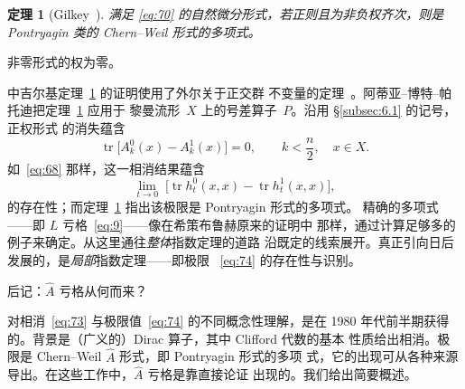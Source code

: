 \documentclass[11pt]{amsart}
\makeatletter
\def\subsection{\@startsection{subsection}{2}%
   \z@{1.25\linespacing\@plus.7\linespacing}{.5\linespacing}%
   {\normalfont\bfseries}}
\theoremstyle{definition}
\theoremstyle{remark}
\theoremstyle{plain}
\newtheorem{theorem}[equation]{定理}
\numberwithin{equation}{section}
\renewcommand{\:}{\colon}
\newcommand{\Ahat}{{\hat A}}
\DeclareMathOperator{\tr}{tr}
\makeatother
\begin{document}
  \begin{theorem}[Gilkey~\cite{Gi1}]\label{thm:13}
 满足 \eqref{eq:70} 的自然微分形式，若正则且为非负权齐次，则是 Pontryagin
 类的 Chern–Weil 形式的多项式。
  \end{theorem}

\noindent
 非零形式的权为零。

\cite{ABP} 中吉尔基定理~\ref{thm:13} 的证明使用了外尔关于正交群
不变量的定理~\cite{W}。阿蒂亚–博特–帕托迪把定理~\ref{thm:13} 应用于
黎曼流形~$X$ 上的号差算子~$P$。沿用 §\ref{subsec:6.1} 的记号，正权形式
的消失蕴含
  \begin{equation}\label{eq:73}
     \tr\bigl[A^0_k(x) - A^1_k(x) \bigr]=0,\qquad k<\frac n2,\quad x\in X. 
  \end{equation}
如~\eqref{eq:68} 那样，这一相消结果蕴含
  \begin{equation}\label{eq:74}
     \lim\limits_{t\to0}\;\bigl[\tr h^0_t(x,x) - \tr h^1_t(x,x) \bigr], 
  \end{equation}
的存在性；而定理~\ref{thm:13} 指出该极限是 Pontryagin 形式的多项式。
精确的多项式——即 $L$ 亏格~\eqref{eq:9}——像在希策布鲁赫原来的证明中
那样，通过计算足够多的例子来确定。从这里通往\emph{整体}指数定理的道路
沿既定的线索展开。真正引向日后发展的，是\emph{局部}指数定理——即极限
~\eqref{eq:74} 的存在性与识别。

  \subsection{后记：$\Ahat$ 亏格从何而来？}\label{subsec:6.3}

对相消~\eqref{eq:73} 与极限值~\eqref{eq:74} 的不同概念性理解，是在 1980
年代前半期获得的。背景是（广义的）Dirac 算子，其中 Clifford 代数的基本
性质给出相消。极限是 Chern–Weil $\Ahat$ 形式，即 Pontryagin 形式的多项
式，它的出现可从各种来源导出。在这些工作中，$\Ahat$ 亏格是靠直接论证
出现的。我们给出简要概述。
\end{document}
